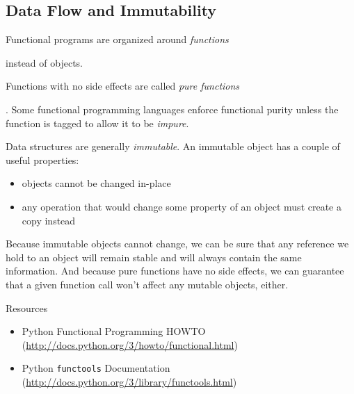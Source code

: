\documentclass[ignorenonframetext,red]{beamer}
\begin{document}
\subsection{Data Flow and Immutability}
\begin{frame}
Functional programs are organized around \textit{functions}
\end{frame}%
instead of objects.
\begin{frame}%
Functions with no side effects are called \textit{pure functions}%
\end{frame}.
Some functional programming languages enforce functional purity unless the function is tagged to allow it to be \textit{impure}.
\begin{frame}%
Data structures are generally \textit{immutable}. An immutable object has a couple of useful properties:
\begin{itemize}
\pause \item objects cannot be changed in-place
\pause \item any operation that would change some property of an object must create a copy instead
\end{itemize}
\end{frame}
\noindent Because immutable objects cannot change, we can be sure that any reference we hold to an object will remain stable and will always contain the same information. And because pure functions have no side effects, we can guarantee that a given function call won't affect any mutable objects, either.

\begin{frame}{Resources}
\begin{itemize}
	\item Python Functional Programming HOWTO\\(\url{http://docs.python.org/3/howto/functional.html})
	\item Python {\tt functools} Documentation\\(\url{http://docs.python.org/3/library/functools.html})
\end{itemize}
\end{frame}
\end{document}
